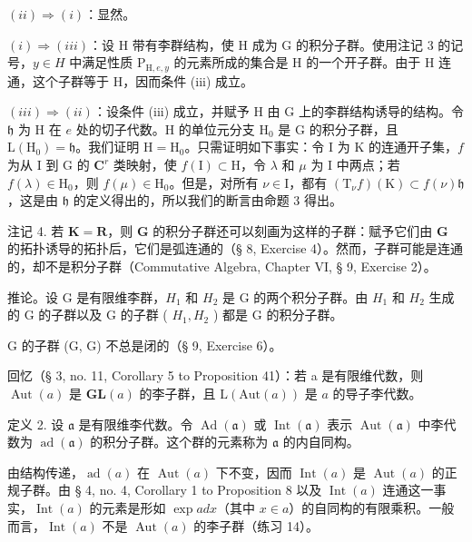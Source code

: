 \((ii) \Rightarrow (i)\)：显然。

\((i) \Rightarrow (iii)\)：设 H 带有李群结构，使 H 成为 G 的积分子群。使用注记 3 的记号，\(y \in H\) 中满足性质 \(\mathrm{P}_{\mathrm{H},e,y}\) 的元素所成的集合是 H 的一个开子群。由于 H 连通，这个子群等于 H，因而条件 (iii) 成立。

\((iii) \Rightarrow (ii)\)：设条件 (iii) 成立，并赋予 H 由 G 上的李群结构诱导的结构。令 \(\mathfrak{h}\) 为 H 在 \(e\) 处的切子代数。H 的单位元分支 \(\mathrm{H}_0\) 是 G 的积分子群，且 \(\mathrm{L}(\mathrm{H}_0) = \mathfrak{h}\)。我们证明 \(\mathrm{H} = \mathrm{H}_0\)。只需证明如下事实：令 I 为 K 的连通开子集，\(f\) 为从 I 到 G 的 \(\mathbf{C}^r\) 类映射，使 \(f(\mathrm{I}) \subset \mathrm{H}\)，令 \(\lambda\) 和 \(\mu\) 为 I 中两点；若 \(f(\lambda) \in \mathrm{H}_0\)，则 \(f(\mu) \in \mathrm{H}_0\)。但是，对所有 \(\nu \in \mathrm{I}\)，都有 \((\mathrm{T}_{\nu}f)(\mathrm{K}) \subset f(\nu)\mathfrak{h}\)，这是由 \(\mathfrak{h}\) 的定义得出的，所以我们的断言由命题 3 得出。

注记 4. 若 \(\mathbf{K} = \mathbf{R}\)，则 \(\mathbf{G}\) 的积分子群还可以刻画为这样的子群：赋予它们由 \(\mathbf{G}\) 的拓扑诱导的拓扑后，它们是弧连通的（§ 8, Exercise 4）。然而，子群可能是连通的，却不是积分子群（Commutative Algebra, Chapter VI, § 9, Exercise 2）。

推论。设 G 是有限维李群，\(H_{1}\) 和 \(H_{2}\) 是 G 的两个积分子群。由 \(H_{1}\) 和 \(H_{2}\) 生成的 G 的子群以及 G 的子群 ( \(H_{1}, H_{2}\) ) 都是 G 的积分子群。

G 的子群 (G, G) 不总是闭的（§ 9, Exercise 6）。

回忆（§ 3, no. 11, Corollary 5 to Proposition 41）：若 a 是有限维代数，则 \(\operatorname{Aut}(a)\) 是 \(\mathbf{GL}(a)\) 的李子群，且 \(\mathrm{L}(\mathrm{Aut}(a))\) 是 \(a\) 的导子李代数。

定义 2. 设 \(\mathfrak{a}\) 是有限维李代数。令 \(\operatorname{Ad}(\mathfrak{a})\) 或 \(\operatorname{Int}(\mathfrak{a})\) 表示 \(\operatorname{Aut}(\mathfrak{a})\) 中李代数为 \(\operatorname{ad}(\mathfrak{a})\) 的积分子群。这个群的元素称为 \(\mathfrak{a}\) 的内自同构。

由结构传递，\(\operatorname{ad}(a)\) 在 \(\operatorname{Aut}(a)\) 下不变，因而 \(\operatorname{Int}(a)\) 是 \(\operatorname{Aut}(a)\) 的正规子群。由 § 4, no. 4, Corollary 1 to Proposition 8 以及 \(\operatorname{Int}(a)\) 连通这一事实，\(\operatorname{Int}(a)\) 的元素是形如 \(\exp ad x\)（其中 \(x \in a\)）的自同构的有限乘积。一般而言，\(\operatorname{Int}(a)\) 不是 \(\operatorname{Aut}(a)\) 的李子群（练习 14）。

